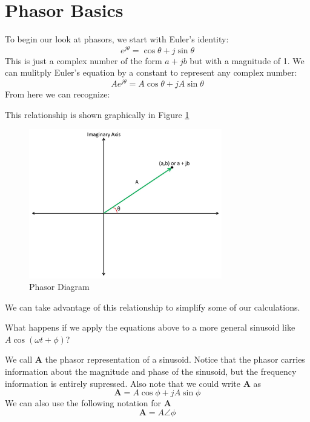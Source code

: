 \documentclass{handout}
\begin{document}
\section{Phasor Basics}
To begin our look at phasors, we start with Euler's identity:
\[
e^{j\theta} = \cos \theta +j \sin \theta
\]  
This is just a complex number of the form $a+jb$ but with a magnitude of 1.  We can mulitply  Euler's equation by a constant to represent any complex number:
\[
Ae^{j\theta} =A \cos \theta +j A\sin \theta
\]  
From here we can recognize:
\soln{1.5in}{
\[
A\cos\theta = \mathbf{Re} [Ae^{j\theta}]
\]
\[
A\sin\theta = \mathbf{Im} [Ae^{j\theta}]
\]

}

This relationship is shown graphically in Figure \ref{fig: PhasorDiagram}

\begin{figure} [h!]
\centering
\includegraphics[width=0.75\textwidth]{PhasorDiagram.jpg}
\caption{Phasor Diagram}
\label{fig: PhasorDiagram}
\end{figure}

We can take advantage of this relationship to simplify some of our calculations.  

What happens if we apply the equations above to a more general sinusoid like $A\cos(\omega t + \phi)$?


We call $\mathbf{A}$ the phasor representation of a  sinusoid.  Notice that the phasor carries information about the magnitude and phase of the sinusoid, but the frequency information is entirely supressed.  Also note that we could write $\mathbf{A}$ as 
\[
\mathbf{A} = A\cos\phi+jA\sin\phi
\]
We can also use the following notation for $\mathbf{A}$
\[
\mathbf{A} = A\angle\phi
\]
\end{document}
